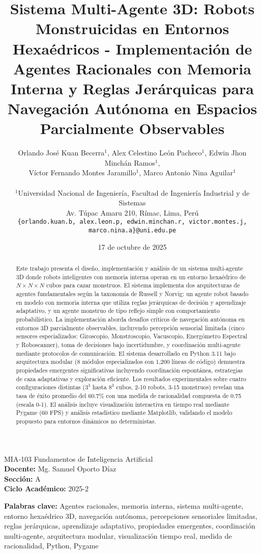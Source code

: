 \documentclass[10pt,twocolumn]{article}
\title{Sistema Multi-Agente 3D: Robots Monstruicidas en Entornos Hexaédricos - Implementación de Agentes Racionales con Memoria Interna y Reglas Jerárquicas para Navegación Autónoma en Espacios Parcialmente Observables}
\author{
  Orlando José Kuan Becerra$^1$, Alex Celestino León Pacheco$^1$, Edwin Jhon Minchán Ramos$^1$, \\
  Víctor Fernando Montes Jaramillo$^1$, Marco Antonio Nina Aguilar$^1$ \\
  \\
  $^1$Universidad Nacional de Ingeniería, Facultad de Ingeniería Industrial y de Sistemas \\
  Av. Túpac Amaru 210, Rímac, Lima, Perú \\
  {\tt \{orlando.kuan.b, alex.leon.p, edwin.minchan.r, victor.montes.j, marco.nina.a\}@uni.edu.pe}
}
\date{17 de octubre de 2025}
\begin{document}
\maketitle

 MIA-103 Fundamentos de Inteligencia Artificial \\
{\bf Docente:} Mg. Samuel Oporto Díaz \\
{\bf Sección:} A \\
{\bf Ciclo Académico:} 2025-2

\begin{abstract}
Este trabajo presenta el diseño, implementación y análisis de un sistema multi-agente 3D donde robots inteligentes con memoria interna operan en un entorno hexaédrico de $N \times N \times N$ cubos para cazar monstruos. El sistema implementa dos arquitecturas de agentes fundamentales según la taxonomía de Russell y Norvig: un agente robot basado en modelo con memoria interna que utiliza reglas jerárquicas de decisión y aprendizaje adaptativo, y un agente monstruo de tipo reflejo simple con comportamiento probabilístico. La implementación aborda desafíos críticos de navegación autónoma en entornos 3D parcialmente observables, incluyendo percepción sensorial limitada (cinco sensores especializados: Giroscopio, Monstroscopio, Vacuscopio, Energómetro Espectral y Roboscanner), toma de decisiones bajo incertidumbre, y coordinación multi-agente mediante protocolos de comunicación. El sistema desarrollado en Python 3.11 bajo arquitectura modular (8 módulos especializados con 1,200 líneas de código) demuestra propiedades emergentes significativas incluyendo coordinación espontánea, estrategias de caza adaptativas y exploración eficiente. Los resultados experimentales sobre cuatro configuraciones distintas ($3^3$ hasta $8^3$ cubos, 2-10 robots, 3-15 monstruos) revelan una tasa de éxito promedio del 60.7\% con una medida de racionalidad compuesta de 0.75 (escala 0-1). El análisis incluye visualización interactiva en tiempo real mediante Pygame (60 FPS) y análisis estadístico mediante Matplotlib, validando el modelo propuesto para entornos dinámicos no deterministas.
\end{abstract}

{\bf Palabras clave:} Agentes racionales, memoria interna, sistema multi-agente, entorno hexaédrico 3D, navegación autónoma, percepciones sensoriales limitadas, reglas jerárquicas, aprendizaje adaptativo, propiedades emergentes, coordinación multi-agente, arquitectura modular, visualización tiempo real, medida de racionalidad, Python, Pygame
\end{document}
